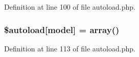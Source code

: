 Definition at line 100 of file autoload.\+php.

\subsubsection[{\texorpdfstring{\$autoload}{$autoload}}]{\setlength{\rightskip}{0pt plus 5cm}\$autoload\mbox{[}\textquotesingle{}model\textquotesingle{}\mbox{]} = array()}\hypertarget{autoload_8php_a942b884082b1defda7fb10ee71bba324}{}\label{autoload_8php_a942b884082b1defda7fb10ee71bba324}


Definition at line 113 of file autoload.\+php.

